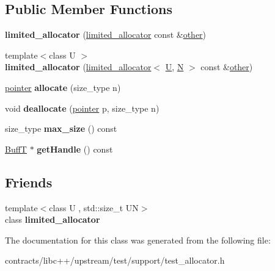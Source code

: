 \subsection*{Public Member Functions}
\begin{DoxyCompactItemize}
\item 
\mbox{\label{classlimited__allocator_add9a062dc626f539526c75cab27e648a}} 
{\bfseries limited\+\_\+allocator} (\mbox{\hyperlink{classlimited__allocator}{limited\+\_\+allocator}} const \&\mbox{\hyperlink{structother}{other}})
\item 
\mbox{\label{classlimited__allocator_a1789b3b3b6215168d02350f7f6867476}} 
{\footnotesize template$<$class U $>$ }\\{\bfseries limited\+\_\+allocator} (\mbox{\hyperlink{classlimited__allocator}{limited\+\_\+allocator}}$<$ \mbox{\hyperlink{union_u}{U}}, \mbox{\hyperlink{group__types_gaf9c1edb0e0da55ec6ba09f32f6839529}{N}} $>$ const \&\mbox{\hyperlink{structother}{other}})
\item 
\mbox{\label{classlimited__allocator_ab0f6a59c2a579643d5da77719b5d6ca2}} 
\mbox{\hyperlink{struct_t}{pointer}} {\bfseries allocate} (size\+\_\+type n)
\item 
\mbox{\label{classlimited__allocator_aef20037b03622391c529c6ea4ea3b6c7}} 
void {\bfseries deallocate} (\mbox{\hyperlink{struct_t}{pointer}} p, size\+\_\+type n)
\item 
\mbox{\label{classlimited__allocator_a52cfa47386a063a8e40985c10f8fa8c5}} 
size\+\_\+type {\bfseries max\+\_\+size} () const
\item 
\mbox{\label{classlimited__allocator_a34128b6dafc8c283556fef1d8806b724}} 
\mbox{\hyperlink{structlimited__alloc__handle}{BuffT}} $\ast$ {\bfseries get\+Handle} () const
\end{DoxyCompactItemize}
\subsection*{Friends}
\begin{DoxyCompactItemize}
\item 
\mbox{\label{classlimited__allocator_a29e4a6db72326016c4e81cef45d4e0f1}} 
{\footnotesize template$<$class U , std\+::size\+\_\+t UN$>$ }\\class {\bfseries limited\+\_\+allocator}
\end{DoxyCompactItemize}


The documentation for this class was generated from the following file\+:\begin{DoxyCompactItemize}
\item 
contracts/libc++/upstream/test/support/test\+\_\+allocator.\+h\end{DoxyCompactItemize}
